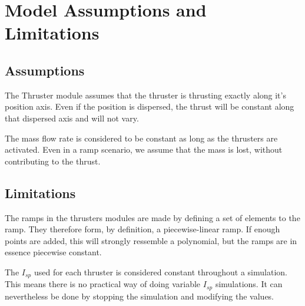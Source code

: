 \section{Model Assumptions and Limitations}

\subsection{Assumptions}

The Thruster module assumes that the thruster is thrusting exactly along it's position axis. Even if the position is dispersed, the thrust will be constant along that dispersed axis and will not vary.

The mass flow rate is considered to be constant as long as the thrusters are activated. Even in a ramp scenario, we assume that the mass is lost, without contributing to the thrust.

\subsection{Limitations}

The ramps in the thrusters modules are made by defining a set of elements to the ramp. They therefore form, by definition, a piecewise-linear ramp. If enough points are added, this will strongly ressemble a polynomial, but the ramps are in essence piecewise constant.

The $I_{sp}$ used for each thruster is considered constant throughout a simulation. This means there is no practical way of doing variable $I_{sp}$ simulations. It can nevertheless be done by stopping the simulation and modifying the values.

